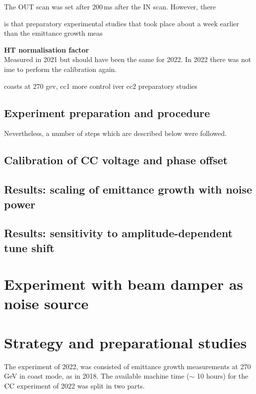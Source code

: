 The OUT scan was set after 200\,ms after the IN scan. However, there 

is that preparatory experimental studies that took place about a week earlier than the emittance growth meas

\textbf{HT normalisation factor}\\
Measured in 2021 but should have been the same for 2022. In 2022 there was not ime to perform the calibration again.

coasts at 270 gev, cc1 more control iver cc2 preparatory studies 


\subsection{Experiment preparation and procedure}



Nevertheless, a number of steps which are described below were followed.

\subsection{Calibration of CC voltage and phase offset}\label{subsec:cc_calibration_2022}
\subsection{Results: scaling of emittance growth with noise power}
\subsection{Results: sensitivity to amplitude-dependent tune shift} 

\section{Experiment with beam damper as noise source}



\newpage

\section{Strategy and preparational studies}\label{sec:strategy_md_2022}
The experiment of 2022, was consisted of emittance growth measurements at 270\,GeV in coast mode, as in 2018. The available machine time ($\sim$ 10 hours) for the ${\mathrm{CC}}$ experiment of 2022 was split in two parts. 


